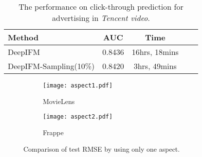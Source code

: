 \documentclass[letterpaper]{article} \usepackage{aaai19}  \usepackage{times}  \usepackage{helvet}  \usepackage{courier}  \usepackage{url}  \usepackage{graphicx}  \frenchspacing  \setlength{\pdfpagewidth}{8.5in}  \setlength{\pdfpageheight}{11in}  \usepackage{mathtools}
\begin{document}
\begin{table}[t]
\caption{The performance on click-through prediction for advertising in \emph{Tencent video}.}
\label{fig:large_dataset} 
\begin{center}
\begin{small} 
\begin{sc} 
\begin{tabular}{lcccr} 
\hline
 Method &AUC & Time \\ 
\hline 
DeepIFM  &  0.8436 & 16hrs, 18mins \\ 
DeepIFM-Sampling(10\%) &  0.8420  &  3hrs, 49mins  \\
\hline \end{tabular} \end{sc} \end{small} \end{center} \end{table}  


\begin{figure}[t!]
\begin{center} 
\begin{subfigure}[MovieLens]{0.47\columnwidth}
{
\texttt{[image: aspect1.pdf]}
\caption{MovieLens}
}
\end{subfigure} 
\begin{subfigure}[Frappe]{0.47\columnwidth}
{
\texttt{[image: aspect2.pdf]}
\caption{Frappe}
} 
\end{subfigure} 
\caption{ Comparison of test RMSE by using only one aspect.} 
\label{fig:aspect} 
\end{center}
\end{figure} 
\end{document}
